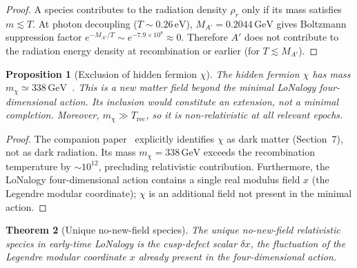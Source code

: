 \documentclass[12pt]{article}
\theoremstyle{plain}
\newtheorem{theorem}{Theorem}[section]
\newtheorem{proposition}[theorem]{Proposition}
\theoremstyle{definition}
\numberwithin{equation}{section}
\begin{document}
\begin{proof}
A species contributes to the radiation density $\rho_r$ only if its mass
satisfies $m\lesssim T$.  At photon decoupling ($T\sim0.26\,\mathrm{eV}$),
$M_{A'}=0.2044\,\mathrm{GeV}$ gives Boltzmann suppression factor
$e^{-M_{A'}/T}\sim e^{-7.9\times10^8}\approx 0$.
Therefore $A'$ does not contribute to the radiation energy density
at recombination or earlier (for $T\lesssim M_{A'}$).
\end{proof}

\begin{proposition}[Exclusion of hidden fermion $\chi$]\label{prop:excchi}
The hidden fermion $\chi$ has mass
$m_\chi\simeq338\,\mathrm{GeV}$~\cite{ParticleCosmo}.
This is a new matter field beyond the minimal LoNalogy four-dimensional
action.  Its inclusion would constitute an extension, not a minimal completion.
Moreover, $m_\chi\gg T_{\mathrm{rec}}$, so it is non-relativistic at all
relevant epochs.
\end{proposition}

\begin{proof}
The companion paper~\cite{ParticleCosmo} explicitly identifies $\chi$ as
dark matter (Section~7), not as dark radiation.  Its mass
$m_\chi=338\,\mathrm{GeV}$ exceeds the recombination temperature by
$\sim10^{12}$, precluding relativistic contribution.
Furthermore, the LoNalogy four-dimensional action contains a single real
modulus field $x$ (the Legendre modular coordinate); $\chi$ is an additional
field not present in the minimal action.
\end{proof}

\begin{theorem}[Unique no-new-field species]\label{thm:species}
The unique no-new-field relativistic species in early-time LoNalogy
is the cusp-defect scalar $\delta x$, the fluctuation of the
Legendre modular coordinate $x$ already present in the four-dimensional
action.
\end{theorem}
\end{document}
